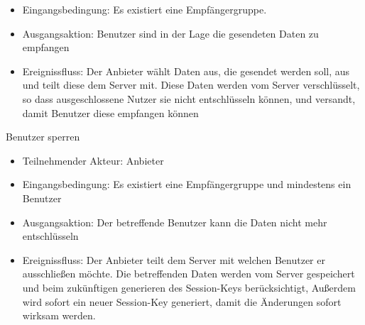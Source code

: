 \documentclass[a4paper,10pt]{scrartcl}
\begin{document}
\begin{usecase}
{\begin{itemize}
   \item Eingangsbedingung: Es existiert eine Empfängergruppe.
   \item Ausgangsaktion: Benutzer sind in der Lage die gesendeten Daten zu empfangen
   \item Ereignissfluss: Der Anbieter wählt Daten aus, die gesendet werden soll, aus und
         teilt diese dem Server mit. Diese Daten werden vom Server verschlüsselt, so 
         dass ausgeschlossene Nutzer sie nicht entschlüsseln können, und versandt, damit
         Benutzer diese empfangen können
   \end{itemize}
}
 {Benutzer sperren
   \begin{itemize}
   \item Teilnehmender Akteur: Anbieter
   \item Eingangsbedingung: Es existiert eine Empfängergruppe und mindestens ein Benutzer
   \item Ausgangsaktion: Der betreffende Benutzer kann die Daten nicht mehr entschlüsseln
   \item Ereignissfluss: Der Anbieter teilt dem Server mit welchen Benutzer er ausschließen möchte.
         Die betreffenden Daten werden vom Server gespeichert und beim zukünftigen generieren des
         Session-Keys berücksichtigt, Außerdem wird sofort ein neuer Session-Key generiert,
         damit die Änderungen sofort wirksam werden.
   \end{itemize}
}
\end{usecase}
\clearpage
\end{document}
